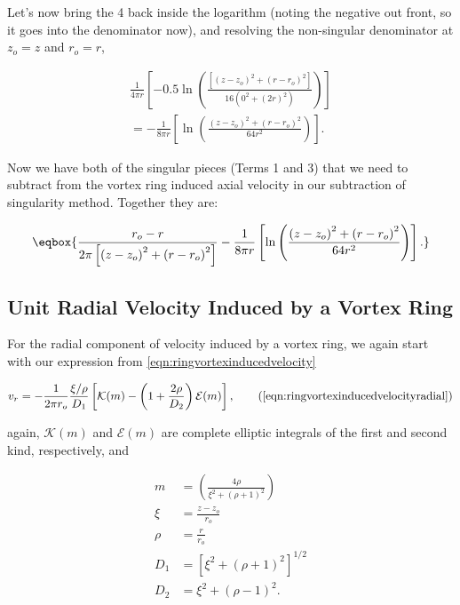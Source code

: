 \noindent Let's now bring the 4 back inside the logarithm (noting the negative out front, so it goes into the denominator now), and resolving the non-singular denominator at \(z_o=z\) and \(r_o=r\),

\begin{equation}
    \begin{aligned}
        \frac{1}{4\pi r} \left[ - 0.5 \ln\left(\frac{\left[\left(z-z_o\right)^2 + \left(r-r_o\right)^2\right]}{16\left(0^2 + (2r)^2\right)}\right)\right] \\
        =-\frac{1}{8\pi r} \left[ \ln\left(\frac{\left(z-z_o\right)^2 + \left(r-r_o\right)^2}{64r^2}\right)\right].
    \end{aligned}
\end{equation}

Now we have both of the singular pieces (Terms 1 and 3) that we need to subtract from the vortex ring induced axial velocity in our subtraction of singularity method. Together they are:

\begin{equation}
\eqbox{
    \frac{r_o-r}{2\pi\left[\left(z-z_o\right)^2 + \left(r-r_o\right)^2\right] }
    -\frac{1}{8\pi r} \left[\ln\left(\frac{\left(z-z_o\right)^2 + \left(r-r_o\right)^2}{64r^2}\right)\right].
}
\end{equation}


\subsection{Unit Radial Velocity Induced by a Vortex Ring}

For the radial component of velocity induced by a vortex ring, we again start with our expression from \cref{eqn:ringvortexinducedvelocity}

\begin{equation}
    v_{r} = -\frac{1}{2 \pi r_o} \frac{\xi/\rho}{D_1}  \left[ \mathcal{K}(m) - \left( 1 + \frac{2\rho}{D_2} \right) \mathcal{E}(m) \right],
    \tag{\ref{eqn:ringvortexinducedvelocityradial}}
\end{equation}

\where again, \(\mathcal{K}(m)\) and \(\mathcal{E}(m)\) are complete elliptic integrals of the first and second kind, respectively, and

\[
    \begin{aligned}
    m &= \left( \frac{4\rho}{\xi^2 + (\rho+1)^2} \right) \\%
    \xi &= \frac{z - z_o}{r_o} \\
    \rho &= \frac{r}{r_o} \\
    D_1 &= \left[\xi^2 + (\rho+1)^2\right]^{1/2} \\
    D_2 &= \xi^2 + (\rho - 1)^2.
    \end{aligned}
\]

